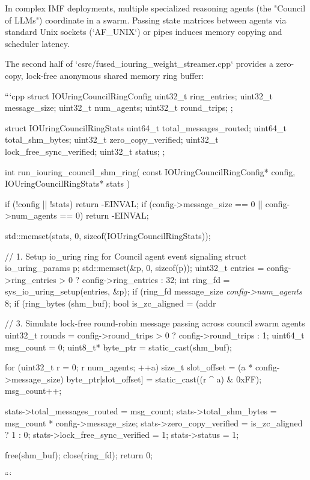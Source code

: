 \documentclass[11pt,twoside,openright]{amsbook}
\begin{document}
{{{{{{{In complex IMF deployments, multiple specialized reasoning agents (the "Council of LLMs") coordinate in a swarm. Passing state matrices between agents via standard Unix sockets (`AF_UNIX`) or pipes induces memory copying and scheduler latency.

The second half of `csrc/fused_iouring_weight_streamer.cpp` provides a zero-copy, lock-free anonymous shared memory ring buffer:

```cpp
struct IOUringCouncilRingConfig {
    uint32_t ring_entries;
    uint32_t message_size;
    uint32_t num_agents;
    uint32_t round_trips;
};

struct IOUringCouncilRingStats {
    uint64_t total_messages_routed;
    uint64_t total_shm_bytes;
    uint32_t zero_copy_verified;
    uint32_t lock_free_sync_verified;
    uint32_t status;
};

int run_iouring_council_shm_ring(
    const IOUringCouncilRingConfig* config,
    IOUringCouncilRingStats* stats
) {
    if (!config || !stats) return -EINVAL;
    if (config->message_size == 0 || config->num_agents == 0) return -EINVAL;

    std::memset(stats, 0, sizeof(IOUringCouncilRingStats));

    // 1. Setup io_uring ring for Council agent event signaling
    struct io_uring_params p;
    std::memset(&p, 0, sizeof(p));
    uint32_t entries = config->ring_entries > 0 ? config->ring_entries : 32;
    int ring_fd = sys_io_uring_setup(entries, &p);
    if (ring_fd message_size \textit{ config->num_agents } 8;
    if (ring_bytes (shm_buf);
    bool is_zc_aligned = (addr %

    // 3. Simulate lock-free round-robin message passing across council swarm agents
    uint32_t rounds = config->round_trips > 0 ? config->round_trips : 1;
    uint64_t msg_count = 0;
    uint8_t* byte_ptr = static_cast(shm_buf);

    for (uint32_t r = 0; r num_agents; ++a) {
            size_t slot_offset = (a * config->message_size) %
            byte_ptr[slot_offset] = static_cast((r ^ a) & 0xFF);
            msg_count++;
        }
    }

    stats->total_messages_routed = msg_count;
    stats->total_shm_bytes = msg_count * config->message_size;
    stats->zero_copy_verified = is_zc_aligned ? 1 : 0;
    stats->lock_free_sync_verified = 1;
    stats->status = 1;

    free(shm_buf);
    close(ring_fd);
    return 0;
}
```

}}}}}}
\end{document}
